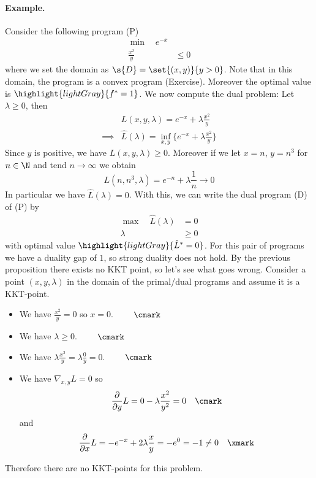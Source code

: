 \documentclass[answers]{exam}
\begin{document}
    \paragraph{Example.} Consider the following program (P)
    \begin{align*}
        \min \quad e^{-x} & \\ 
        \frac{x^2}{y} &\leq 0
    \end{align*}
    where we set the domain as $\s{D} = \set{(x,y)}{y > 0}$. 
    Note that in this domain, the program is a convex program (Exercise). Moreover the optimal value is $\highlight{lightGray}{f^* = 1}$. We now compute the dual problem: Let $\lambda \geq 0$, then
    \begin{align*}
        &L(x,y,\lambda) = e^{-x} + \lambda \frac{x^2}{y} \\
        \implies & \hat{L}(\lambda) = \inf_{x,y} \Big\{e^{-x} + \lambda \frac{x^2}{y}\Big\}
    \end{align*}
    Since $y$ is positive, we have $L(x,y,\lambda) \geq 0$. Moreover if we let $x = n$, $y = n^3$ for $n\in \N$ and tend $n\to \infty$ we obtain 
    $$ L(n, n^3, \lambda) = e^{-n} + \lambda\frac{1}{n} \to 0 $$
    In particular we have $\hat{L}(\lambda) = 0$. With this, we can write the dual program (D) of (P) by 
    \begin{align*}
        \max \quad \hat{L}(\lambda) &= 0 \\ 
        \lambda &\geq 0
    \end{align*}
    with optimal value $\highlight{lightGray}{\hat{L}^* = 0}$. For this pair of programs we have a duality gap of $1$, so strong duality does not hold. By the previous proposition there exists no KKT point, so let's see what goes wrong. Consider a point $(x, y, \lambda)$ in the domain of the primal/dual programs and assume it is a KKT-point.
    \begin{itemize}
        \item[\circled{1}] We have $\tfrac{x^2}{y} = 0$ so $x = 0$. $\qquad \text{\cmark}$
        \item[\circled{2}] We have $\lambda \geq 0$. $\qquad \text{\cmark}$
        \item[\circled{3}] We have $\lambda\tfrac{x^2}{y} = \lambda\tfrac{0}{y} = 0$. $\qquad \text{\cmark}$
        \item[\circled{4}] We have $\nabla_{x,y} L = 0$ so
        $$ \frac{\partial}{\partial y} L = 0 - \lambda \frac{x^2}{y^2} = 0 \quad\text{\cmark}  $$
        and 
        $$ \frac{\partial}{\partial x} L = -e^{-x} + 2\lambda \frac{x}{y} = -e^{0} = -1 \neq 0\quad \text{\xmark}  $$
    \end{itemize}
    Therefore there are no KKT-points for this problem.
\end{document}
